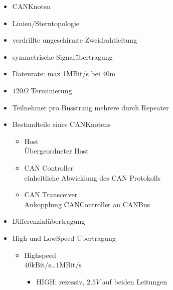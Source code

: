 \documentclass[letterpaper,10pt,english]{jupyterBook}
\begin{document}
\sphinxAtStartPar
{}
\begin{itemize}
\item {} 
\sphinxAtStartPar
CAN\sphinxhyphen{}Knoten

\item {} 
\sphinxAtStartPar
Linien\sphinxhyphen{}/Sterntopologie

\item {} 
\sphinxAtStartPar
verdrillte ungeschirmte Zweidrahtleitung

\item {} 
\sphinxAtStartPar
symmetrische Signalübertragung

\item {} 
\sphinxAtStartPar
Datenrate: max 1MBit/s bei 40m

\item {} 
\sphinxAtStartPar
\(120\Omega\) Terminierung

\item {} 
 Teilnehmer pro Busstrang
mehrere durch Repeater

\item {} 
\sphinxAtStartPar
Bestandteile eines CAN\sphinxhyphen{}Knotens
\begin{itemize}
\item {} 
\sphinxAtStartPar
Host\\
Übergeordneter Host

\item {} 
\sphinxAtStartPar
CAN Controller\\
einheitliche Abwicklung des CAN Protokolls

\item {} 
\sphinxAtStartPar
CAN Transceiver\\
Ankopplung CAN\sphinxhyphen{}Controller an CAN\sphinxhyphen{}Bus

\end{itemize}

\item {} 
\sphinxAtStartPar
Differenzialübertragung

\item {} 
\sphinxAtStartPar
High\sphinxhyphen{} und Low\sphinxhyphen{}Speed Übertragung
\begin{itemize}
\item {} 
\sphinxAtStartPar
Highspeed\\
\(40\text{kBit/s}\)…\(1\text{MBit/s}\)
\begin{itemize}
\item {} 
\sphinxAtStartPar
HIGH: rezessiv, \(2.5V\) auf beiden Leitungen


\end{itemize}
\end{itemize}
\end{itemize}
\end{document}
